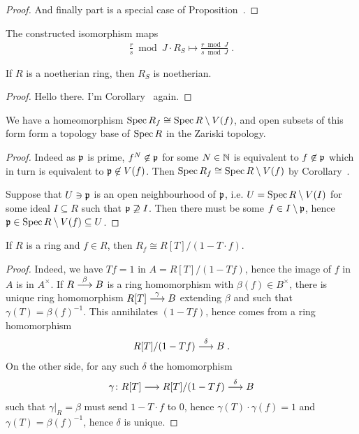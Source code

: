 \documentclass[a4paper,parskip=half,numbers=enddot, DIV=12]{scrreprt}
\begin{document}
\begin{proof}
		And finally part  is a special case of Proposition~.
	\end{proof}
	\begin{rem*}
		The constructed isomorphism maps 
		\begin{align*}
			\frac{r}{s}\bmod J\cdot R_S\longmapsto\frac{r\bmod J}{s\bmod J}\;.
		\end{align*}		
	\end{rem*}
	\begin{cor}
		If $R$ is a noetherian ring, then $R_S$ is noetherian.
	\end{cor}
	\begin{proof}
		Hello there. I'm Corollary~ again.
	\end{proof}
	\begin{cor}
		We have a homeomorphism $\operatorname{Spec} R_f \cong \operatorname{Spec} R\setminus V(f)$, and open subsets of this form form a topology base of $\operatorname{Spec} R$ in the Zariski topology.
	\end{cor}
	\begin{proof}
		 Indeed as $\mathfrak{p}$ is prime, $f^N\not\in\mathfrak{p}$ for some $N\in\mathbb{N}$ is equivalent to $f\not\in\mathfrak{p}$ which in turn is equivalent to $\mathfrak{p}\not\in V(f)$. Then $\operatorname{Spec} R_f\cong\operatorname{Spec} R\setminus V(f)$ by Corollary~.
		 
		 Suppose that $U\ni\mathfrak{p}$ is an open neighbourhood of $\mathfrak{p}$, i.e. $U=\operatorname{Spec} R\setminus V(I)$ for some ideal $I\subseteq R$ such that $\mathfrak{p}\not\supseteq I$. Then there must be some $f\in I\setminus \mathfrak{p}$, hence $\mathfrak{p}\in\operatorname{Spec} R\setminus V(f)\subseteq U$.
	\end{proof}
	\begin{example}
		If $R$ is a ring and $f\in R$, then $R_f\cong R[T]/(1-T\cdot f)$.
	\end{example}
	\begin{proof}
		Indeed, we have $Tf = 1$ in $A=R[T]/(1-Tf)$, hence the image of $f$ in $A$ is in $A^\times$. If $R\morphism[\beta] B$ is a ring homomorphism with $\beta(f)\in B^\times$, there is unique ring homomorphism $R[T]\morphism[\gamma] B$ extending $\beta$ and such that $\gamma(T) =\beta(f)^{-1}$. This annihilates $(1-Tf)$, hence comes from a ring homomorphism 
		\begin{align*}
			R[T]/(1-Tf) \morphism[\delta]B\;. 
		\end{align*}
		On the other side, for any such $\delta$ the homomorphism 
		\begin{align*}
			\gamma\colon R[T]\morphism R[T]/(1-Tf)\morphism[\delta] B
		\end{align*}
		such that $\gamma|_R = \beta$ must send $1-T\cdot f$ to 0, hence $\gamma(T) \cdot \gamma(f) = 1$ and $\gamma(T) = \beta(f)^{-1}$, hence $\delta$ is unique.
	\end{proof}
\end{document}
